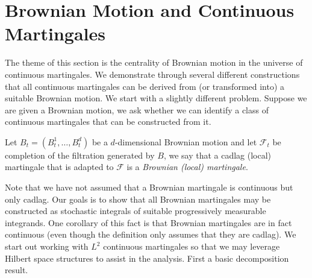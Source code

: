 \section{Brownian Motion and Continuous Martingales}

The theme of this section is the centrality of Brownian motion in the universe of continuous martingales.  We demonstrate through several different constructions that all continuous martingales can be derived from (or transformed into) a suitable Brownian motion.  We start with a slightly different problem.  Suppose we are given a Brownian motion, we ask whether we can identify a class of continuous martingales that can be constructed from it.

\begin{defn}Let $B_t=(B^1_t, \dotsc, B^d_t)$ be a $d$-dimensional Brownian motion and let $\mathcal{F}_t$ be completion of the filtration generated by $B$, we say that a cadlag (local) martingale that is adapted to $\mathcal{F}$ is a \emph{Brownian (local) martingale}.
\end{defn}

Note that we have not assumed that a Brownian martingale is continuous but only cadlag.  Our goals is to show that all Brownian martingales may be constructed as stochastic integrals of suitable progressively measurable integrands.  One corollary of this fact is that Brownian martingales are in fact continuous (even though the definition only assumes that they are cadlag).  We start out working with $L^2$ continuous martingales so that we may leverage Hilbert space structures to assist in the analysis.  First a basic decomposition result.


